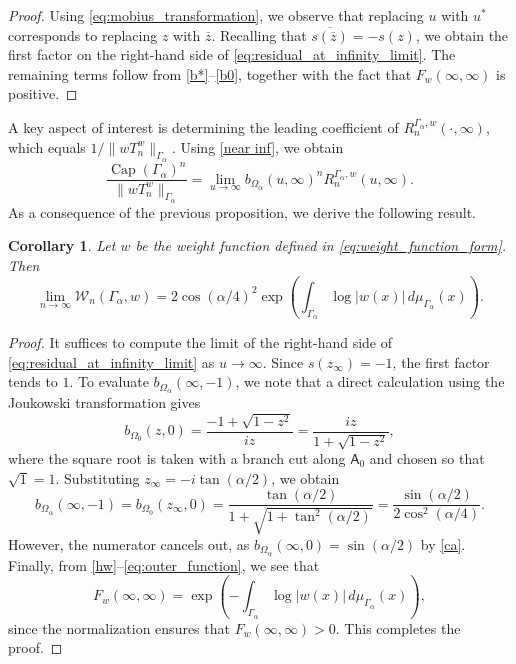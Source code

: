 \documentclass[12pt,oneside,reqno]{amsart}
\newtheorem{corollary}[theorem]{Corollary}
\theoremstyle{definition}
\numberwithin{equation}{section}
\newcommand{\sfA}{\mathsf{A}}
\newcommand{\cW}{{\mathcal{W}}}
\renewcommand{\Cap}{\operatorname{Cap}}
\begin{document}
\begin{proof}
Using \eqref{eq:mobius_transformation}, we observe that replacing $u$ with $u^*$ corresponds to replacing $z$ with $\overline{z}$. Recalling that $\overline{s(\overline{z})}=-s(z)$, we obtain the first factor on the right-hand side of \eqref{eq:residual_at_infinity_limit}. The remaining terms follow from \eqref{b*}--\eqref{b0}, together with the fact that $F_w(\infty, \infty)$ is positive.
\end{proof}

A key aspect of interest is determining the leading coefficient of $R_{n}^{\Gamma_\alpha,w}(\cdot,\infty)$, which equals $1/\|wT_n^{w}\|_{\Gamma_\alpha}$. Using \eqref{near inf}, we obtain
\[
   \frac{\Cap(\Gamma_\alpha)^n}{\|wT_n^w\|_{\Gamma_\alpha}} = 
   \lim_{u\rightarrow \infty}b_{\Omega_{\alpha}}(u,\infty)^nR_{n}^{\Gamma_\alpha,w}(u,\infty). 
\]
As a consequence of the previous proposition, we derive the following result.

\begin{corollary}
Let $w$ be the weight function defined in \eqref{eq:weight_function_form}. Then 
\begin{equation}
   \lim_{n\rightarrow \infty}\cW_n(\Gamma_\alpha,w) = 
   2\cos(\alpha/4)^2\exp\left(\int_{\Gamma_\alpha} \log |w(x)|\,d\mu_{\Gamma_\alpha}(x)\right).
\end{equation}
\end{corollary}

\begin{proof}
It suffices to compute the limit of the right-hand side of \eqref{eq:residual_at_infinity_limit} as $u\to\infty$. Since $s(z_\infty)=-1$, the first factor tends to $1$. 
To evaluate $b_{\Omega_\alpha}(\infty, -1)$, we note that a direct calculation using the Joukowski transformation gives
\[
   b_{\Omega_0}(z,0)  = \frac{-1+\sqrt{1-z^2}}{iz} = \frac{iz}{1+\sqrt{1-z^2}},
\]
where the square root is taken with a branch cut along $\sfA_0$ and chosen so that $\sqrt{1}=1$.
Substituting $z_\infty = -i\tan(\alpha/2)$, we obtain
\[
   b_{\Omega_\alpha}(\infty, -1) = b_{\Omega_0}(z_\infty, 0) 
   = \frac{\tan(\alpha/2)}{1+\sqrt{1+\tan^2(\alpha/2)}} %
   = \frac{\sin(\alpha/2)}{2\cos^2(\alpha/4)}.
\]
However, the numerator cancels out, as $b_{\Omega_\alpha}(\infty, 0) = \sin(\alpha/2)$ by \eqref{ca}.
Finally, from \eqref{hw}--\eqref{eq:outer_function}, we see that 
\[
   F_w(\infty,\infty)=\exp\left(-\int_{\Gamma_\alpha} \log |w(x)|\,d\mu_{\Gamma_\alpha}(x)\right),
\]
since the normalization ensures that $F_w(\infty,\infty)>0$. This completes the proof.
\end{proof}
\end{document}
